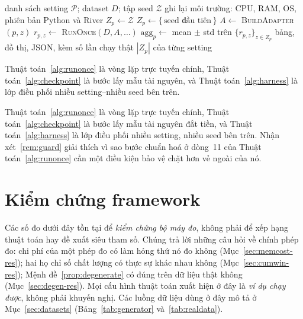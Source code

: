 \documentclass[11pt,a4paper]{article}
\theoremstyle{remark}
\begin{document}
\begin{algorithm}[htbp]
\caption{\textsc{RunBenchmark} --- nhiều setting, nhiều seed, cùng một luồng}
\label{alg:harness}
\begin{algorithmic}[1]
\Require danh sách setting $\mathcal{P}$; dataset $D$; tập seed $\mathcal{Z}$
\State ghi lại môi trường: CPU, RAM, OS, phiên bản Python và River
    \State $Z_p \gets \mathcal{Z}$
  \Else
    \State $Z_p \gets \{\,\text{seed đầu tiên}\,\}$
  \EndIf
    \State $A \gets$ \textsc{BuildAdapter}$(p, z)$
    \State $r_{p,z} \gets$ \textsc{RunOnce}$(D, A, \dots)$
  \EndFor
  \State $\text{agg}_p \gets$ mean $\pm$ std trên $\{r_{p,z}\}_{z \in Z_p}$
\EndFor
\State \Return bảng, đồ thị, JSON, kèm số lần chạy thật $|Z_p|$ của từng setting
\end{algorithmic}
\end{algorithm}

Thuật toán~\ref{alg:runonce} là vòng lặp trực tuyến chính,
Thuật toán~\ref{alg:checkpoint} là bước lấy mẫu tài nguyên, và
Thuật toán~\ref{alg:harness} là lớp điều phối nhiều setting--nhiều seed bên trên.

Thuật toán~\ref{alg:runonce} là vòng lặp trực tuyến chính,
Thuật toán~\ref{alg:checkpoint} là bước lấy mẫu tài nguyên đắt tiền, và
Thuật toán~\ref{alg:harness} là lớp điều phối nhiều setting, nhiều seed bên
trên. Nhận xét~\ref{rem:guard} giải thích vì sao bước chuẩn hoá ở dòng~11 của
Thuật toán~\ref{alg:runonce} cần một điều kiện bảo vệ chặt hơn vẻ ngoài của nó.

\section{Kiểm chứng framework}
\label{sec:results}

Các số đo dưới đây tồn tại để \emph{kiểm chứng bộ máy đo}, không phải để xếp
hạng thuật toán hay đề xuất siêu tham số. Chúng trả lời những câu hỏi về chính
phép đo: chi phí của một phép đo có làm hỏng thứ nó đo không
(Mục~\ref{sec:memcost-res}); hai họ chỉ số chất lượng có thực sự khác nhau không
(Mục~\ref{sec:cumwin-res}); Mệnh đề~\ref{prop:degenerate} có đúng trên dữ liệu
thật không (Mục~\ref{sec:degen-res}). Mọi cấu hình thuật toán xuất hiện ở đây là
\emph{ví dụ chạy được}, không phải khuyến nghị. Các luồng dữ liệu dùng ở đây mô
tả ở Mục~\ref{sec:datasets} (Bảng~\ref{tab:generator} và~\ref{tab:realdata}).
\end{document}
